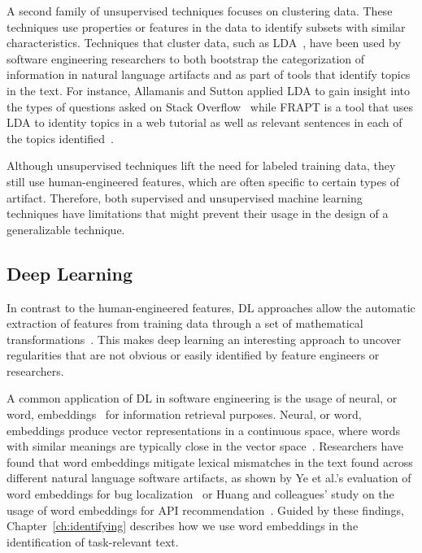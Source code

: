 A second family of unsupervised techniques focuses on clustering data.
These techniques use properties or features in the data to 
identify 
subsets with similar characteristics. 
Techniques that cluster data, such as \acf{LDA}~\cite{blei2003latent},
have been used by software engineering researchers to both 
bootstrap the categorization of information in 
natural language artifacts and as part of tools that identify topics in the text. 
For instance, Allamanis and Sutton
applied \acs{LDA}
to gain insight into the types of questions 
asked on Stack Overflow~\cite{Allamanis2013}
while FRAPT is a tool that 
uses \acs{LDA} to identity topics in a web tutorial
as well as relevant sentences in each of the topics identified~\cite{Jiang2017}.



Although unsupervised techniques lift the need for labeled training data,
they still use human-engineered features, 
which are often specific to certain 
types of artifact. Therefore, 
both supervised and unsupervised machine learning techniques
have limitations that might prevent their usage 
in the design of a generalizable technique.




\subsection{Deep Learning }
\label{cp2:deep-learning}



In contrast to the human-engineered features,
\acf{DL} approaches allow the automatic extraction of features 
from training data through a set of mathematical transformations~\cite{Deng2018, zhang2021deep}.
This makes 
deep learning an interesting 
approach to
uncover regularities 
that are not obvious or easily identified
by feature engineers or researchers.



A common application of \acs{DL} in software engineering is the usage of neural, or word, embeddings~\cite{Mikolov2013}
for information retrieval purposes. 
Neural, or word, embeddings produce vector representations in a continuous space,
where words with similar meanings are typically close in the vector space~\cite{harris1954distributional, mikolov2013efficient}. 
Researchers have found that word
embeddings mitigate lexical mismatches in the text found across different 
natural language software artifacts,
as shown by Ye et al.'s evaluation of word embeddings
for bug localization~\cite{Ye2016}
or Huang and colleagues' study on 
the usage of word embeddings for API recommendation~\cite{Huang2018}.
Guided by these findings, Chapter~\ref{ch:identifying} describes 
how we use word embeddings in the identification 
of task-relevant text.



